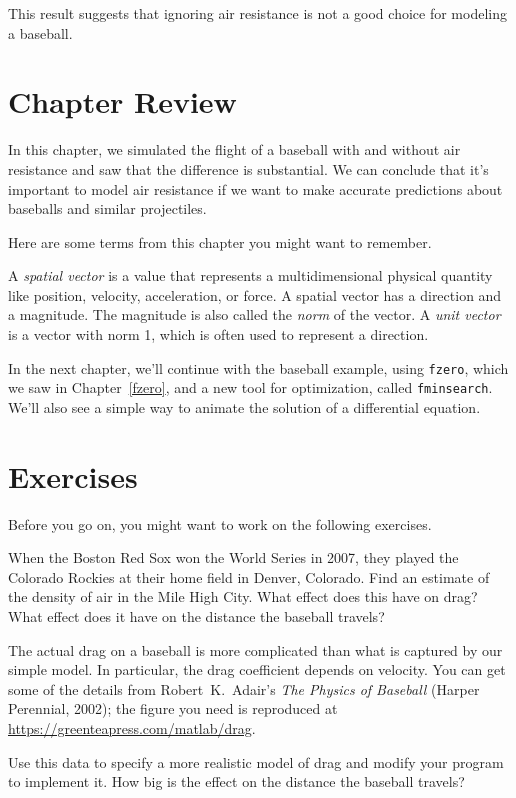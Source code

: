 This result suggests that ignoring air resistance is not a good choice for modeling a baseball.

\section{Chapter Review}

In this chapter, we simulated the flight of a baseball with and without air resistance and saw that the difference is substantial.
We can conclude that it's important to model air resistance if we want to make accurate predictions about baseballs and similar projectiles.

Here are some terms from this chapter you might want to remember.

A \emph{spatial vector} is a value that represents a multidimensional physical quantity like position, velocity, acceleration, or force.
A spatial vector has a direction and a magnitude.  The magnitude is also called the \emph{norm} of the vector.
A \emph{unit vector} is a vector with norm 1, which is often used to represent a
direction.

In the next chapter, we'll continue with the baseball example, using \lstinline{fzero}, which we saw in Chapter~\ref{fzero}, and a new tool for optimization, called \lstinline{fminsearch}.  We'll also see a simple way to animate the solution of a differential equation.


\section{Exercises}

Before you go on, you might want to work on the following exercises.

\begin{ex}


When the Boston Red Sox won the World Series in 2007, they played the
Colorado Rockies at their home field in Denver, Colorado.  Find an
estimate of the density of air in the Mile High City.  What effect
does this have on drag?  What effect does it have on the distance the baseball travels?
\end{ex}


\begin{ex}


The actual drag on a baseball is more complicated than what is
captured by our simple model.  In particular, the drag coefficient
depends on velocity.  You can get some of the details from Robert~K.\ Adair's \emph{The
Physics of Baseball} (Harper Perennial, 2002); the figure you need is reproduced at \url{https://greenteapress.com/matlab/drag}.

Use this data to specify a more realistic model of drag and modify your
program to implement it.  How big is the effect on the distance the baseball travels?
\end{ex}


